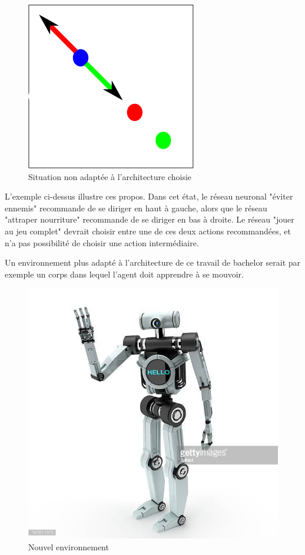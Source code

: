\documentclass[11pt,a4paper]{report}
\begin{document}
   \begin{figure}[!h]
   \center
   \includegraphics[scale=0.3]{ressources/percpective.png}
   \caption{Situation non adaptée à l'architecture choisie}
   \end{figure} 

  \newpage
  \par L'exemple ci-dessus illustre ces propos. Dans cet état, le réseau neuronal "éviter ennemis" recommande de se diriger en haut à gauche, alors que le réseau  "attraper nourriture" recommande de se diriger en bas à droite. Le réseau "jouer au jeu complet" devrait choisir entre une de ces deux actions recommandées, et n'a pas possibilité de choisir une action intermédiaire. 
  
  \par Un environnement plus adapté à l'architecture de ce travail de bachelor serait par exemple un corps dans lequel l'agent doit apprendre à se mouvoir. 
  
   \begin{figure}[!h]
   \center
   \includegraphics[scale=1]{ressources/robot.jpg}
   \caption{Nouvel environnement}
   \end{figure} 
   
\end{document}
